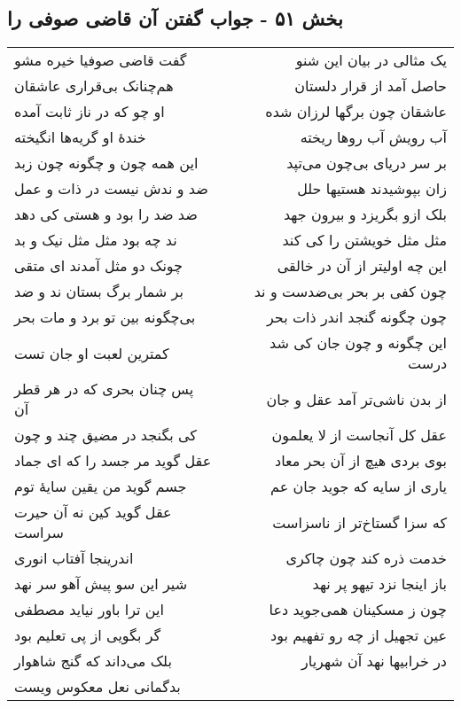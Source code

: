 \begin{center}
\section*{بخش ۵۱ - جواب گفتن آن قاضی صوفی را}
\label{sec:sh051}
\begin{longtable}{l p{0.5cm} r}
گفت قاضی صوفیا خیره مشو
&&
یک مثالی در بیان این شنو
\\
هم‌چنانک بی‌قراری عاشقان
&&
حاصل آمد از قرار دلستان
\\
او چو که در ناز ثابت آمده
&&
عاشقان چون برگها لرزان شده
\\
خندهٔ او گریه‌ها انگیخته
&&
آب رویش آب روها ریخته
\\
این همه چون و چگونه چون زبد
&&
بر سر دریای بی‌چون می‌تپد
\\
ضد و ندش نیست در ذات و عمل
&&
زان بپوشیدند هستیها حلل
\\
ضد ضد را بود و هستی کی دهد
&&
بلک ازو بگریزد و بیرون جهد
\\
ند چه بود مثل مثل نیک و بد
&&
مثل مثل خویشتن را کی کند
\\
چونک دو مثل آمدند ای متقی
&&
این چه اولیتر از آن در خالقی
\\
بر شمار برگ بستان ند و ضد
&&
چون کفی بر بحر بی‌ضدست و ند
\\
بی‌چگونه بین تو برد و مات بحر
&&
چون چگونه گنجد اندر ذات بحر
\\
کمترین لعبت او جان تست
&&
این چگونه و چون جان کی شد درست
\\
پس چنان بحری که در هر قطر آن
&&
از بدن ناشی‌تر آمد عقل و جان
\\
کی بگنجد در مضیق چند و چون
&&
عقل کل آنجاست از لا یعلمون
\\
عقل گوید مر جسد را که ای جماد
&&
بوی بردی هیچ از آن بحر معاد
\\
جسم گوید من یقین سایهٔ توم
&&
یاری از سایه که جوید جان عم
\\
عقل گوید کین نه آن حیرت سراست
&&
که سزا گستاخ‌تر از ناسزاست
\\
اندرینجا آفتاب انوری
&&
خدمت ذره کند چون چاکری
\\
شیر این سو پیش آهو سر نهد
&&
باز اینجا نزد تیهو پر نهد
\\
این ترا باور نیاید مصطفی
&&
چون ز مسکینان همی‌جوید دعا
\\
گر بگویی از پی تعلیم بود
&&
عین تجهیل از چه رو تفهیم بود
\\
بلک می‌داند که گنج شاهوار
&&
در خرابیها نهد آن شهریار
\\
بدگمانی نعل معکوس ویست

\end{longtable}
\end{center}
